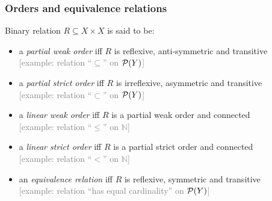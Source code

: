 \documentclass[fleqn,10pt,serif,xcolor=svgnames,xcolor=table,aspectratio=169,handout]{beamer}
\newcommand{\mygray}[1]{\textcolor{gray}{#1}}
\begin{document}
\begin{frame}
  \frametitle{Orders and equivalence relations}
  Binary relation $R \subseteq X \times X$ is said to be:

  \begin{itemize}

    \item  a \textit{partial weak order} iff $R$ is reflexive, anti-symmetric and transitive \\
    \hfill \mygray{[example: relation ``$\subseteq$'' on $\mathcal{P}(Y)$]}
    \item  a \textit{partial strict order} iff $R$ is irreflexive, asymmetric and transitive \\
    \hfill \mygray{[example: relation ``$\subset$'' on $\mathcal{P}(Y)$]}
    \item  a \textit{linear weak order} iff $R$ is a partial weak order and connected \\
    \hfill \mygray{[example: relation ``$\le$'' on $\mathds{N}$]}
    \item  a \textit{linear strict order} iff $R$ is a partial strict order and connected \\
    \hfill \mygray{[example: relation ``$<$'' on $\mathds{N}$]}
    \item an \textit{equivalence relation} iff $R$ is reflexive, symmetric and transitive \\
    \hfill \mygray{[example: relation ``has equal cardinality'' on $\mathcal{P}(Y)$]}

  \end{itemize}

\end{frame}
\end{document}
